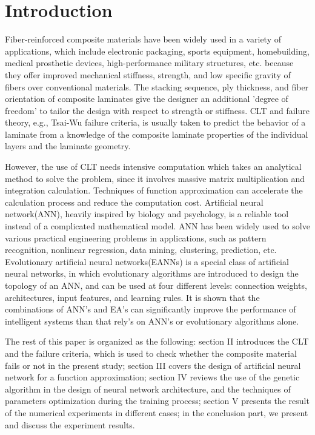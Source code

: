 \section{Introduction}
Fiber-reinforced composite materials have been widely used in a variety of
applications, which include electronic packaging, sports equipment,
homebuilding, medical prosthetic devices, high-performance military
structures, etc. because they offer improved mechanical stiffness, strength,
and low specific gravity of fibers over conventional materials.  The stacking
sequence, ply thickness, and fiber orientation of composite laminates give the
designer an additional ’degree of freedom’ to tailor the design with respect to
strength or stiffness. CLT and failure theory, e.g., Tsai-Wu failure criteria,
is usually taken to predict the behavior of a laminate from a knowledge of the
composite laminate properties of the individual layers and the laminate
geometry.

However, the use of CLT needs intensive computation which takes an analytical
method to solve the problem, since it involves massive matrix multiplication
and integration calculation. Techniques of function approximation can
accelerate the calculation process and reduce the computation cost.  Artificial
neural network(ANN), heavily inspired by biology and psychology, is a reliable
tool instead of a complicated mathematical model. ANN has been widely used to
solve various practical engineering problems in applications, such as pattern
recognition, nonlinear regression, data mining, clustering,  prediction, etc.
Evolutionary artificial neural networks(EANNs) is a special class of
artificial neural networks, in which evolutionary algorithms are
introduced to design the topology of an ANN, and can be used at four different
levels: connection weights, architectures, input features, and learning rules.
It is shown that the combinations of ANN's and EA's can significantly improve
the performance of intelligent systems than that rely's on ANN's or
evolutionary algorithms alone.

The rest of this paper is organized as the following: section II introduces the
CLT and the failure criteria, which is used to check whether the composite
material fails or not in the present study; section III covers the design of
artificial neural network for a function approximation; section IV reviews the
use of the genetic algorithm in the design of neural network architecture, and
the techniques of parameters optimization during the training process; section
V presents the result of the numerical experiments in different cases; in the
conclusion part, we present and discuss the experiment results.




